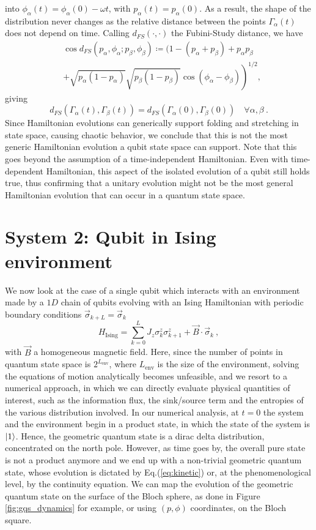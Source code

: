 \documentclass[draft,nofootinbib,pre,twocolumn,showpacs,showkeys,preprintnumbers,floatfix]{revtex4-1}
\newcommand{\1}{\mathbbm{1}}
\begin{document}
into $\phi_\alpha(t) = \phi_\alpha(0)- \omega t$, with $p_\alpha(t)=p_\alpha(0)$.
As a result, the shape of the distribution never changes as the relative distance
between the points $\Gamma_\alpha(t)$ does not depend on time. Calling $d_{FS}(\cdot,\cdot)$
the Fubini-Study distance, we have
\begin{align}
&\cos d_{FS}(p_\alpha, \phi_\alpha;p_\beta,\phi_\beta) \coloneqq \Big(1-(p_\alpha+p_\beta)+p_\alpha p_\beta \nonumber \\
&\left. +\sqrt{p_\alpha(1-p_\alpha)}\sqrt{p_\beta(1-p_\beta)}\cos (\phi_\alpha-\phi_\beta)\right)^{1/2},
\end{align}
giving
\begin{equation}
d_{FS}(\Gamma_\alpha(t),\Gamma_\beta(t))=d_{FS}(\Gamma_\alpha(0),\Gamma_\beta(0)) \quad \forall \alpha,\beta~.\label{eq:nochaos}
\end{equation}
Since Hamiltonian evolutions can generically support folding and stretching 
in state space, causing chaotic behavior, we conclude that this is not the 
most generic Hamiltonian evolution a qubit state space can support. Note
that this goes beyond the assumption of a time-independent Hamiltonian.
Even with time-dependent Hamiltonian, this aspect of the isolated evolution
of a qubit still holds true, thus confirming that a unitary evolution might not be
the most general Hamiltonian evolution that can occur in a quantum state space.

\section{System 2: Qubit in Ising environment}
\label{sec:EXAMPLES2}

We now look at the case of a single qubit which interacts with an environment 
made by a $1D$ chain of qubits evolving with an Ising Hamiltonian with periodic
boundary conditions $\vec{\sigma}_{k+L}= \vec{\sigma}_k$
\begin{equation}
H_{\mathrm{Ising}} = \sum_{k=0}^{L} J_z \sigma_k^z \sigma_{k+1}^{z} + \vec{B} \cdot \vec{\sigma}_k~,
\end{equation}
with $\vec{B}$ a homogeneous magnetic field. Here, since the number of points
in quantum state space is $2^{L_{\mathrm{env}}}$, where $L_{\mathrm{env}}$
is the size of the environment, solving the equations of motion analytically becomes
unfeasible, and we resort to a numerical approach, in which we can directly evaluate
physical quantities of interest, such as the information flux, the sink/source term and
the entropies of the various distribution involved. In our numerical analysis, at $t=0$
the system and the environment begin in a product state, in which the state of the system
is $\ket{1}$. Hence, the geometric quantum state is a dirac delta distribution, concentrated 
on the north pole. However, as time goes by, the overall pure state is not a product anymore
and we end up with a non-trivial geometric quantum state, whose evolution
is dictated by Eq.(\ref{eq:kinetic}) or, at the phenomenological level, by the continuity equation. 
We can map the evolution of the geometric quantum state on the surface of the Bloch sphere, 
as done in Figure \ref{fig:gqs_dynamics} for example, or using $(p,\phi)$ coordinates, on the 
Bloch square. 
\end{document}
